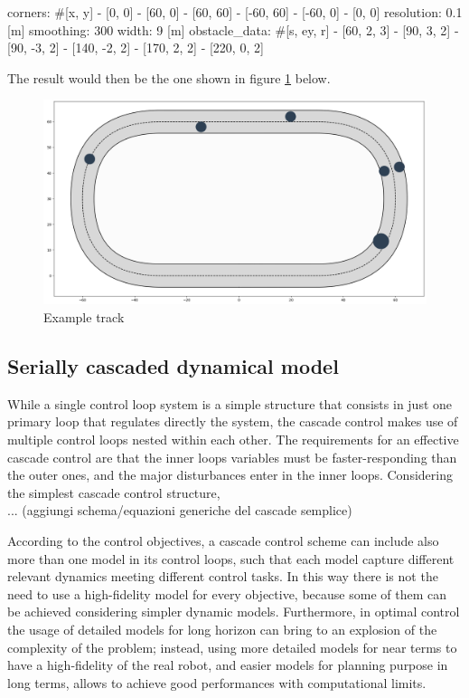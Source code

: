 \documentclass[a4paper, onecolumn, 12pt]{article}
\begin{document}
\begin{myverbatim}[title={Example of a track configuration file}]
corners: #[x, y]
    - [0, 0]
    - [60, 0]
    - [60, 60]
    - [-60, 60]
    - [-60, 0]
    - [0, 0]
resolution: 0.1 [m]
smoothing: 300 
width: 9 [m]
obstacle_data: #[s, ey, r]
    - [60, 2, 3]
    - [90,  3, 2]
    - [90, -3, 2]
    - [140, -2, 2]
    - [170, 2, 2]
    - [220, 0, 2]
\end{myverbatim}

\newpage
The result would then be the one shown in figure \ref*{ippodromo} below. 
\begin{figure}[H]
    \centering
    \includegraphics[width=\textwidth]{assets/ippodromo_obstacles.png}
    \caption{Example track}
    \label{ippodromo}
\end{figure}

\subsection{Serially cascaded dynamical model}
While a single control loop system is a simple structure that consists in
just one primary loop that regulates directly the system, the cascade control
makes use of multiple control loops nested within each other. The requirements
for an effective cascade control are that the inner loops variables must be 
faster-responding than the outer ones, and the major disturbances enter in the 
inner loops. Considering the simplest cascade control structure,\\
... (aggiungi schema/equazioni generiche del cascade semplice)

According to the control objectives, a cascade control scheme can include also 
more than one model in its control loops, such that each model capture different
relevant dynamics meeting different control tasks. In this way there is not the 
need to use a high-fidelity model for every objective, because some of them can 
be achieved considering simpler dynamic models. Furthermore, in optimal control
the usage of detailed models for long horizon can bring to an explosion of the 
complexity of the problem; instead, using more detailed models for near terms 
to have a high-fidelity of the real robot, and easier models for planning purpose
in long terms, allows to achieve good performances with computational limits.
\end{document}
